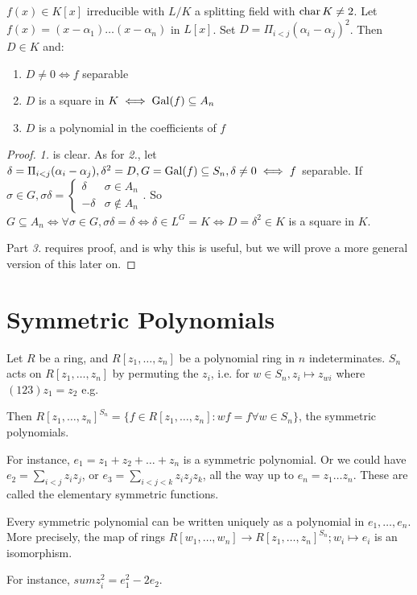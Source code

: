 \documentclass[10pt,a4paper]{article}
\begin{document}
\begin{proposition}
$f(x) \in K[x]$ irreducible with $L/K$ a splitting field with $\operatorname{char} K \neq 2$. Let $f(x) = (x-\alpha_1)\ldots(x-\alpha_n)$ in $L[x]$. Set $D = \Pi_{i<j} (\alpha_i - \alpha_j)^2$. Then $D \in K$ and:
\begin{enumerate}
\item $D \neq 0 \iff f$ separable
\item $D$ is a square in $K \iff \operatorname{Gal}(f) \subseteq A_n$
\item $D$ is a polynomial in the coefficients of $f$
\end{enumerate}
\end{proposition}
\begin{proof}
\textit{1.} is clear. As for \textit{2.}, let $\delta = \Pi_{i<j}(\alpha_i -\alpha_j), \delta^2 = D, G = \operatorname{Gal}(f) \subseteq S_n, \delta \neq 0 \iff f$ separable. If $\sigma \in G, \sigma \delta = \begin{cases} \delta & \sigma \in A_n \\ -\delta & \sigma \notin A_n \end{cases}$. So $G \subseteq A_n \iff \forall \sigma \in G, \sigma \delta = \delta \iff \delta \in L^G = K \iff D = \delta^2 \in K$ is a square in $K$.

Part \textit{3.} requires proof, and is why this is useful, but we will prove a more general version of this later on.
\end{proof}
\section{Symmetric Polynomials}
Let $R$ be a ring, and $R[z_1, \ldots, z_n]$ be a polynomial ring in $n$ indeterminates. $S_n$ acts on $R[z_1, \ldots, z_n]$ by permuting the $z_i$, i.e. for $w \in S_n, z_i \mapsto z_{wi}$ where $(123)z_1 = z_2$ e.g.

Then $R[z_1, \ldots, z_n]^{S_n} = \{f \in R[z_1, \ldots, z_n] : wf = f \forall w \in S_n\}$, the symmetric polynomials. 

For instance, $e_1 = z_1 + z_2 + \ldots + z_n$ is a symmetric polynomial. Or we could have $e_2 = \sum_{i<j} z_i z_j$, or $e_3 = \sum_{i<j<k} z_i z_j z_k$, all the way up to $e_n = z_1\ldots z_n$. These are called the elementary symmetric functions.

\begin{theorem}
Every symmetric polynomial can be written uniquely as a polynomial in $e_1, \ldots, e_n$. More precisely, the map of rings $R[w_1, \ldots, w_n] \to R[z_1, \ldots, z_n]^{S_n}; w_i \mapsto e_i$ is an isomorphism.
\end{theorem}
For instance, $sum z_i^2 = e_1^2 - 2e_2$.
\end{document}
